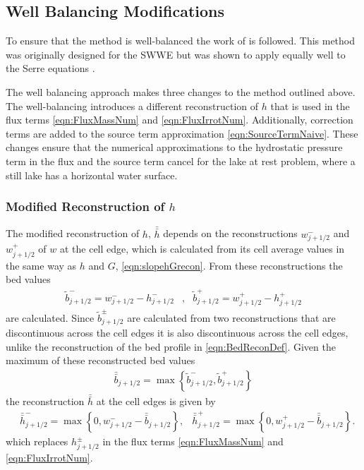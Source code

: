 \documentclass[AMA,STIX1COL]{WileyNJD-v2}
\begin{document}
\subsection{Well Balancing Modifications}
To ensure that the method is well-balanced the work of \citet{Klein-etal-2004-2050} is followed. This method was originally designed for the SWWE but was shown to apply equally well to the Serre equations \cite{Pitt-J-2014}.

The well balancing approach makes three changes to the method outlined above. The well-balancing introduces a different reconstruction of $h$ that is used in the flux terms \eqref{eqn:FluxMassNum} and \eqref{eqn:FluxIrrotNum}. Additionally, correction terms are added to the source term approximation \eqref{eqn:SourceTermNaive}. These changes ensure that the numerical approximations to the hydrostatic pressure term in the flux and the source term cancel for the lake at rest problem, where a still lake has a horizontal water surface.

\subsubsection{Modified Reconstruction of $h$}
The modified reconstruction of $h$, $\bar{\bar{h}}$ depends on the reconstructions $w^-_{j+1/2}$ and $w^+_{j+1/2}$ of $w$ at the cell edge, which is calculated from its cell average values in the same way as $h$ and $G$, \eqref{eqn:slopehGrecon}. From these reconstructions the bed values
\begin{align*}
\tilde{b}^-_{j+1/2} = w^-_{j+1/2} - h^-_{j+1/2} &, &\tilde{b}^+_{j+1/2} = w^+_{j+1/2} - h^+_{j+1/2}
\end{align*}
are calculated. Since $\tilde{b}^\pm_{j+1/2}$ are calculated from two reconstructions that are discontinuous across the cell edges it is also discontinuous across the cell edges, unlike the reconstruction of the bed profile in \eqref{eqn:BedReconDef}. Given the maximum of these reconstructed bed values
\begin{align*}
\bar{\bar{b}}_{j+1/2} = \max\left\lbrace\tilde{b}^-_{j+1/2} , \tilde{b}^+_{j+1/2} \right\rbrace
\end{align*}
the reconstruction $\bar{\bar{h}}$ at the cell edges is given by
\begin{align}
&\bar{\bar{h}}^-_{j+1/2} = \max\left\lbrace 0, w^-_{j+1/2} - \bar{\bar{b}}_{j+1/2}  \right\rbrace, &\bar{\bar{h}}^+_{j+1/2} = \max\left\lbrace 0, w^+_{j+1/2} - \bar{\bar{b}}_{j+1/2} \right\rbrace.
\label{eqn:ModifiedHValue}
\end{align}
which replaces $h^\pm_{j+1/2}$ in the flux terms \eqref{eqn:FluxMassNum} and \eqref{eqn:FluxIrrotNum}.
\end{document}

